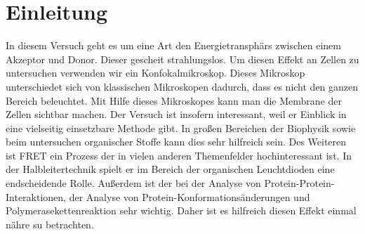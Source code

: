 

\chapter{Einleitung}
\label{chap:einleitung}

In diesem Versuch geht es um eine Art den Energietransphärs zwischen einem Akzeptor und Donor. Dieser gescheit strahlungslos. 
Um diesen Effekt an Zellen zu untersuchen verwenden wir ein Konfokalmikroskop. Dieses Mikroskop unterschiedet sich von klassischen 
Mikroskopen dadurch, dass es nicht den ganzen Bereich beleuchtet. Mit Hilfe dieses Mikroskopes kann man die Membrane der Zellen sichtbar machen. 
Der Versuch ist insofern interessant, weil er Einblick in eine vielseitig einsetzbare Methode gibt. In großen Bereichen der Biophysik sowie beim untersuchen 
organischer Stoffe kann dies sehr hilfreich sein. Des Weiteren ist FRET ein Prozess der in vielen anderen Themenfelder hochinteressant ist. In der Halbleitertechnik 
spielt er im Bereich der organischen Leuchtdioden eine endscheidende Rolle. Außerdem ist der bei der Analyse von Protein-Protein-Interaktionen, der Analyse von Protein-Konformationsänderungen 
und Polymerasekettenreaktion sehr wichtig. Daher ist es hilfreich diesen Effekt einmal nähre su betrachten.
